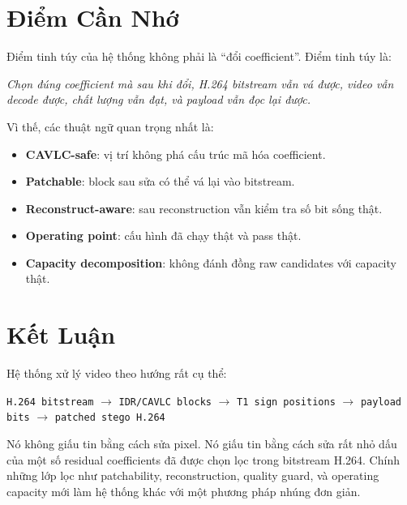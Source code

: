 \documentclass[11pt,a4paper]{article}
\begin{document}
\section{Điểm Cần Nhớ}

Điểm tinh túy của hệ thống không phải là ``đổi coefficient''. Điểm tinh túy là:

\begin{center}
\textit{Chọn đúng coefficient mà sau khi đổi, H.264 bitstream vẫn vá được, video
vẫn decode được, chất lượng vẫn đạt, và payload vẫn đọc lại được.}
\end{center}

Vì thế, các thuật ngữ quan trọng nhất là:

\begin{itemize}[leftmargin=*]
  \item \textbf{CAVLC-safe}: vị trí không phá cấu trúc mã hóa coefficient.
  \item \textbf{Patchable}: block sau sửa có thể vá lại vào bitstream.
  \item \textbf{Reconstruct-aware}: sau reconstruction vẫn kiểm tra số bit sống thật.
  \item \textbf{Operating point}: cấu hình đã chạy thật và pass thật.
  \item \textbf{Capacity decomposition}: không đánh đồng raw candidates với capacity thật.
\end{itemize}

\section{Kết Luận}

Hệ thống xử lý video theo hướng rất cụ thể:

\begin{center}
\texttt{H.264 bitstream}
\(\rightarrow\)
\texttt{IDR/CAVLC blocks}
\(\rightarrow\)
\texttt{T1 sign positions}
\(\rightarrow\)
\texttt{payload bits}
\(\rightarrow\)
\texttt{patched stego H.264}
\end{center}

Nó không giấu tin bằng cách sửa pixel. Nó giấu tin bằng cách sửa rất nhỏ dấu
của một số residual coefficients đã được chọn lọc trong bitstream H.264. Chính
những lớp lọc như patchability, reconstruction, quality guard, và operating
capacity mới làm hệ thống khác với một phương pháp nhúng đơn giản.
\end{document}
